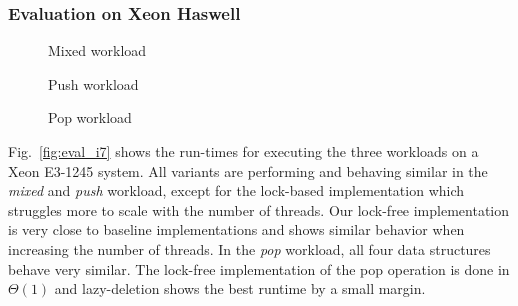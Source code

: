 \subsubsection{Evaluation on Xeon Haswell}
\begin{figure*}[t]
	\centering
	\begin{subfigure}[b]{0.3\textwidth}
		\centering
		
		\caption{Mixed workload}
		\label{fig:xeon_mixed}
	\end{subfigure}
	\hfill
	\begin{subfigure}[b]{0.3\textwidth}
		\centering
		
		\caption{Push workload}
		\label{fig:xeon_push}
	\end{subfigure}
	\hfill
	\begin{subfigure}[b]{0.3\textwidth}
		\centering
		
		\caption{Pop workload}
		\label{fig:xeon_pop}
	\end{subfigure}
	\caption{Runtime for different workloads executed on a Xeon E3-1245 while varying the number of threads}
	\label{fig:eval_i7}
\end{figure*}
Fig.~\ref{fig:eval_i7} shows the run-times for executing the three workloads on a Xeon E3-1245 system. All variants are performing and behaving similar in the \textit{mixed} and \textit{push} workload, except for the lock-based implementation which struggles more to scale with the number of threads. Our lock-free implementation is very close to baseline implementations and shows similar behavior when increasing the number of threads. In the \textit{pop} workload, all four data structures behave very similar.
The lock-free implementation of the pop operation is done in $\Theta(1)$ and lazy-deletion shows the best runtime by a small margin.

